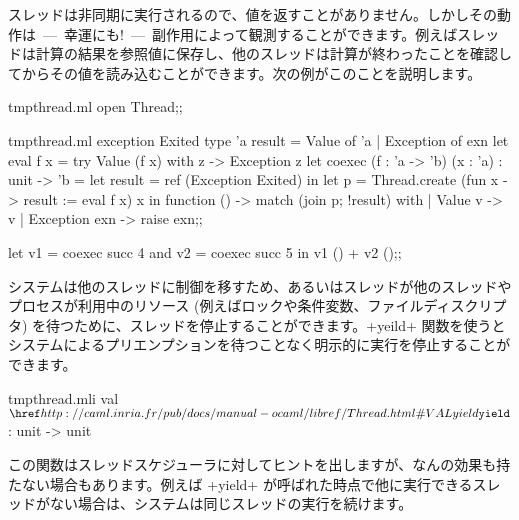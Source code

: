 スレッドは非同期に実行されるので、値を返すことがありません。しかしその動作は~---~幸運にも!~---~副作用によって観測することができます。例えばスレッドは計算の結果を参照値に保存し、他のスレッドは計算が終わったことを確認してからその値を読み込むことができます。次の例がこのことを説明します。
%
\begin{codefile}{tmpthread.ml}
open Thread;;
\end{codefile}
\begin{listingcodefile}{tmpthread.ml}
exception Exited
type 'a result = Value of 'a | Exception of exn
let eval f x = try Value (f x) with z -> Exception z
let coexec (f : 'a -> 'b) (x : 'a) : unit -> 'b =
  let result = ref (Exception Exited) in
  let p = Thread.create (fun x -> result := eval f x) x in
  function () -> match (join p; !result) with
    | Value v -> v
    | Exception exn -> raise exn;;

let v1 = coexec succ 4 and v2 = coexec succ 5 in v1 () + v2 ();;
\end{listingcodefile}

システムは他のスレッドに制御を移すため、あるいはスレッドが他のスレッドやプロセスが利用中のリソース (例えばロックや条件変数、ファイルディスクリプタ) を待つために、スレッドを停止することができます。\ml+yeild+ 関数を使うとシステムによるプリエンプションを待つことなく明示的に実行を停止することができます。
%
\begin{listingcodefile}{tmpthread.mli}
val $\indexlibvalue{Thread}{yield}$ : unit -> unit
\end{listingcodefile}
%
この関数はスレッドスケジューラに対してヒントを出しますが、なんの効果も持たない場合もあります。例えば \ml+yield+ が呼ばれた時点で他に実行できるスレッドがない場合は、システムは同じスレッドの実行を続けます。

